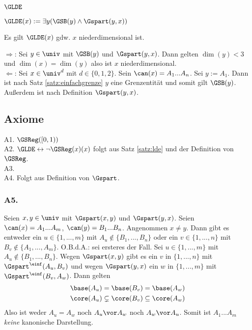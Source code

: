 \subsubsection{$\GLDE$}

\begin{erin}[$GLDE$]
    $\GLDE(x) := \exists y ( \GSB(y) \land \Gspart(y,x) )$
\end{erin}

\begin{satz}[$\GLDE$]\label{satz:lde}
    Es gilt $\GLDE(x)$ gdw. $x$ niederdimensional ist.
\end{satz}

\begin{bew}
    $\boldsymbol{\Rightarrow}$:
    Sei $y \in \univ$ mit $\GSB(y)$ und $\Gspart(y,x)$. Dann gelten $\dim(y) < 3$ und $\dim(x) = \dim(y)$ also ist $x$ niederdimensional.\\
    $\boldsymbol{\Leftarrow}$: Sei $x \in \univ^d$ mit $d \in \{0,1,2\}$.
    Sein $\can(x) = A_1 ... A_n$. Sei $y := A_1$. Dann ist nach Satz \ref{satz:einfachgrenze} $y$ eine Grenzentität und somit gilt $\GSB(y)$.
    Außerdem ist nach Definition $\Gspart(y,x)$.
\end{bew}


\subsection{Axiome}
A1. $\GSReg([0,1))$\\
A2. $\GLDE \leftrightarrow \neg \GSReg(x)(x)$ folgt aus Satz \ref{satz:lde} und der Definition von $\GSReg$.\\
A3.\\
A4. Folgt aus Definition von $\Gspart$.

\subsubsection{A5.}
Seien $x,y \in \univ$ mit $\Gspart(x,y)$ und $\Gspart(y,x)$.
Seien $\can(x) = A_1 ... A_m$, $\can(y) = B_1 ... B_n$.
Angenommen $x \neq y$. Dann gibt es entweder ein $u \in \{1, ..., m\}$ mit $A_u \notin \{B_1, ..., B_n\}$ oder ein $v \in \{1, ..., n\}$ mit $B_v \notin \{A_1, ..., A_m\}$.
O.B.d.A.: sei ersteres der Fall.
Sei $u \in \{1, ..., m\}$ mit $A_u \notin \{B_1, ..., B_n\}$.
Wegen $\Gspart(x,y)$ gibt es ein $v$ in $\{1, ..., n\}$ mit $\Gspart^\einf(A_u,B_v)$ und wegen $\Gspart(y,x)$ ein $w$ in $\{1, ..., m\}$ mit $\Gspart^\einf(B_v,A_w)$.
Dann gelten
\begin{align*}
    \base(A_u) = \base(B_v) = \base(A_w)\\
    \core(A_u) \subsetneq \core(B_v) \subseteq \core(A_w)
\end{align*}
Also ist weder $A_u = A_w$ noch $A_u \vor A_w$ noch $A_w \vor A_u$. 
Somit ist $A_1 ... A_m$ \textit{keine} kanonische Darstellung.


